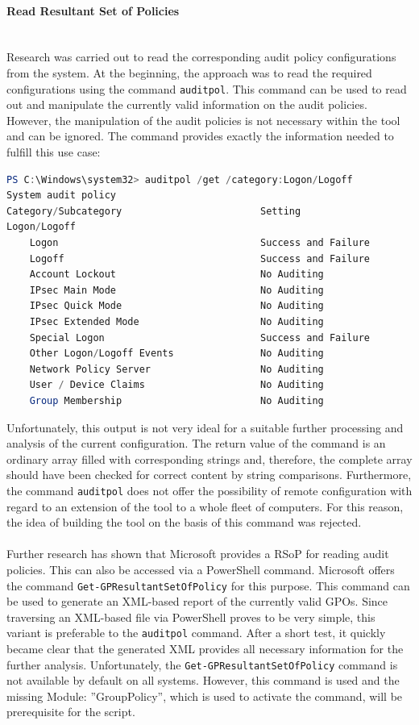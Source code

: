 \paragraph{Read Resultant Set of Policies} \ \\
Research was carried out to read the corresponding audit policy configurations from the system. At the beginning, the approach was to read the required configurations using the command \lstinline|auditpol|. \cite{auditpol} This command can be used to read out and manipulate the currently valid information on the audit policies. However, the manipulation of the audit policies is not necessary within the tool and can be ignored. The command provides exactly the information needed to fulfill this use case:
\begin{lstlisting}[caption=auditpol, language=PowerShell]
PS C:\Windows\system32> auditpol /get /category:Logon/Logoff
System audit policy
Category/Subcategory                        Setting
Logon/Logoff
    Logon                                   Success and Failure
    Logoff                                  Success and Failure
    Account Lockout                         No Auditing
    IPsec Main Mode                         No Auditing
    IPsec Quick Mode                        No Auditing
    IPsec Extended Mode                     No Auditing
    Special Logon                           Success and Failure
    Other Logon/Logoff Events               No Auditing
    Network Policy Server                   No Auditing
    User / Device Claims                    No Auditing
    Group Membership                        No Auditing
\end{lstlisting}
Unfortunately, this output is not very ideal for a suitable further processing and analysis of the current configuration. The return value of the command is an ordinary array filled with corresponding strings and, therefore, the complete array should have been checked for correct content by string comparisons. Furthermore, the command \lstinline|auditpol| does not offer the possibility of remote configuration with regard to an extension of the tool to a whole fleet of computers. For this reason, the idea of building the tool on the basis of this command was rejected.
\\\\
Further research has shown that Microsoft provides a RSoP \cite{RSoP} for reading audit policies. This can also be accessed via a PowerShell command. Microsoft offers the command \lstinline|Get-GPResultantSetOfPolicy| \cite{GetGPResultantSetOfPolicy} for this purpose. This command can be used to generate an XML-based report of the currently valid GPOs. Since traversing an XML-based file via PowerShell proves to be very simple, this variant is preferable to the \lstinline|auditpol| command. After a short test, it quickly became clear that the generated XML provides all necessary information for the further analysis. Unfortunately, the \lstinline|Get-GPResultantSetOfPolicy| command is not available by default on all systems. However, this command is used and the missing Module: ''GroupPolicy'', which is used to activate the command, will be prerequisite for the script. \cite{GroupPolicy} \cite{RSAT}


